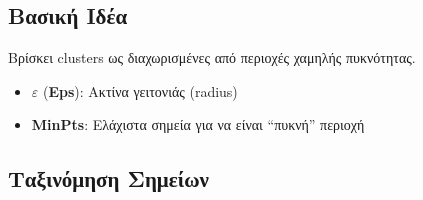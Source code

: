\subsection{Βασική Ιδέα}

Βρίσκει clusters ως  διαχωρισμένες από περιοχές χαμηλής πυκνότητας.

\begin{formulabox}
\begin{itemize}
    \item $\varepsilon$ (\textbf{Eps}): Ακτίνα γειτονιάς (radius)
    \item \textbf{MinPts}: Ελάχιστα σημεία για να είναι ``πυκνή'' περιοχή
\end{itemize}
\end{formulabox}

\subsection{Ταξινόμηση Σημείων}

